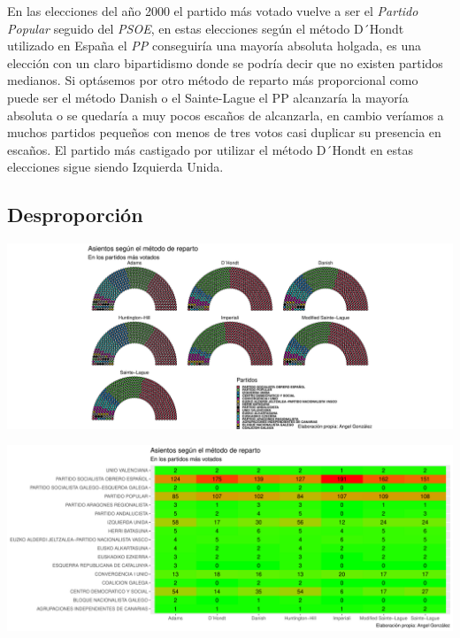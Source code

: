 \documentclass[12pt,a4paper,]{book}
\numberwithin{dummy}{section}
\theoremstyle{ocrenumbox}
\theoremstyle{blacknumex}
\theoremstyle{blacknumbox}
\theoremstyle{ocrenum}
\theoremstyle{ocrenum}
\begin{document}
En las elecciones del año 2000 el partido más votado vuelve a ser el
\emph{Partido Popular} seguido del \emph{PSOE}, en estas elecciones
según el método D´Hondt utilizado en España el \emph{PP} conseguiría una
mayoría absoluta holgada, es una elección con un claro bipartidismo
donde se podría decir que no existen partidos medianos. Si optásemos por
otro método de reparto más proporcional como puede ser el método Danish
o el Sainte-Lague el PP alcanzaría la mayoría absoluta o se quedaría a
muy pocos escaños de alcanzarla, en cambio veríamos a muchos partidos
pequeños con menos de tres votos casi duplicar su presencia en escaños.
El partido más castigado por utilizar el método D´Hondt en estas
elecciones sigue siendo Izquierda Unida.

\hypertarget{desproporciuxf3n-7}{%
\subsection{Desproporción}\label{desproporciuxf3n-7}}

\begin{center}\includegraphics[width=1\linewidth]{figurasR/unnamed-chunk-98-1} \end{center}

\begin{center}\includegraphics[width=1\linewidth]{figurasR/unnamed-chunk-98-2} \end{center}
\end{document}

